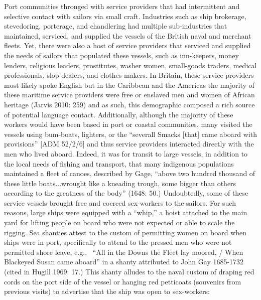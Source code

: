 \documentclass[12pt]{article}
\newenvironment{styleStandard}{\renewcommand\baselinestretch{1.0}\setlength\leftskip{0cm}\setlength\rightskip{0cm plus 1fil}\setlength\parindent{0cm}\setlength\parfillskip{0pt plus 1fil}\setlength\parskip{0in plus 1pt}\writerlistparindent\writerlistleftskip\leavevmode\normalfont\normalsize\writerlistlabel\ignorespaces}{\unskip\vspace{0in plus 1pt}\par}
\newcommand\writerlistleftskip{}
\newcommand\writerlistparindent{}
\newcommand\writerlistlabel{}
\begin{document}
\begin{styleStandard}
Port communities thronged with service providers that had intermittent and selective contact with sailors via small craft. Industries such as ship brokerage, stevedoring, porterage, and chandlering had multiple sub-industries that maintained, serviced, and supplied the vessels of the British naval and merchant fleets. Yet, there were also a host of service providers that serviced and supplied the needs of sailors that populated these vessels, such as inn-keepers, money lenders, religious leaders, prostitutes, washer women, small-goods traders, medical professionals, slop-dealers, and clothes-makers. In Britain, these service providers most likely spoke English but in the Caribbean and the Americas the majority of these maritime service providers were free or enslaved men and women of African heritage (Jarvis 2010: 259) and as such, this demographic composed a rich source of potential language contact. Additionally, although the majority of these workers would have been based in port or coastal communities, many visited the vessels using bum-boats, lighters, or the “severall Smacks [that] came aboard with provisions” [ADM 52/2/6] and thus service providers interacted directly with the men who lived aboard. Indeed, it was for transit to large vessels, in addition to the local needs of fishing and transport, that many indigenous populations maintained a fleet of canoes, described by Gage, “above two hundred thousand of these little boats...wrought like a kneading trough, some bigger than others according to the greatness of the body” (1648: 50.) Undoubtedly, some of these service vessels brought free and coerced sex-workers to the sailors. For such reasons, large ships were equipped with a “whip,” a hoist attached to the main yard for lifting people on board who were not expected or able to scale the rigging. Sea shanties attest to the custom of permitting women on board when ships were in port, specifically to attend to the pressed men who were not permitted shore leave, e.g., \ “All in the Downs the Fleet lay moored, / When Blackeyed Susan came aboard” in a shanty attributed to John Gay 1685-1732 (cited in Hugill 1969: 17.) This shanty alludes to the naval custom of draping red cords on the port side of the vessel or hanging red petticoats (souvenirs from previous visits) to advertise that the ship was open to sex-workers: 
\end{styleStandard}
\end{document}
